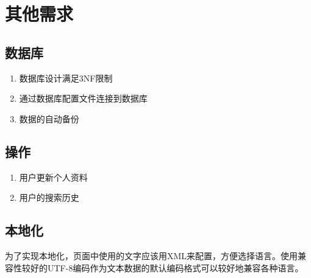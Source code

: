 \chapter{其他需求}

\section{数据库}

\begin{enumerate}
	\item 数据库设计满足3NF限制
	\item 通过数据库配置文件连接到数据库
	\item 数据的自动备份
\end{enumerate}

\section{操作}

\begin{enumerate}
	\item 用户更新个人资料
	\item 用户的搜索历史
\end{enumerate}


\section{本地化}

为了实现本地化，页面中使用的文字应该用XML来配置，方便选择语言。使用兼容性较好的UTF-8编码作为文本数据的默认编码格式可以较好地兼容各种语言。
